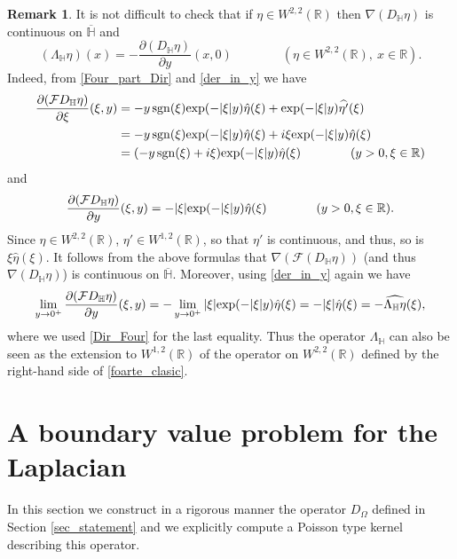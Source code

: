 \documentclass{amsart} %
\numberwithin{equation}{section}
\theoremstyle{definition}
\newtheorem{remark}[theorem]{Remark}
\begin{document}
\begin{remark}\label{rem_clasic}
It is not difficult to check that if $\eta\in W^{2,2}(\mathbb{R})$ then $\nabla(D_\mathbb{H}\eta)$ is continuous on $\overline{\mathbb{H}}$
and
\begin{equation}\label{foarte_clasic}
(\Lambda_\mathbb{H} \eta)(x)=-\frac{\partial (D_\mathbb{H}\eta)}{\partial y}(x,0) \qquad\qquad(\eta\in W^{2,2}(\mathbb{R}),\ x\in \mathbb{R}).
\end{equation}
Indeed, from \eqref{Four_part_Dir} and \eqref{der_in_y} we have
\begin{equation}
\begin{aligned}
 \frac{\partial (\mathcal{F}D_{\mathbb{H}}\eta)}{\partial \xi}(\xi,y)&=-y\,{\rm sgn}(\xi){\rm exp}(-|\xi|y)\hat\eta(\xi)+{\rm exp}(-|\xi|y)\widehat{\eta'}(\xi)\\
 &=-y\,{\rm sgn}(\xi){\rm exp}(-|\xi|y)\hat\eta(\xi)+i\xi{\rm exp}(-|\xi|y)\hat\eta(\xi)\\
 &=(-y\,{\rm sgn}(\xi)+i\xi){\rm exp}(-|\xi|y)\hat\eta(\xi)\qquad\qquad(y>0,\xi\in\mathbb{R})
\end{aligned}
\end{equation}
and
\begin{equation}
\frac{\partial(\mathcal{F}D_{\mathbb{H}}\eta)}{\partial y}(\xi,y)=-|\xi|{\rm exp}(-|\xi|y)\hat\eta(\xi) \qquad\qquad(y>0,\xi\in\mathbb{R}). 
\end{equation}
Since $\eta\in W^{2,2}(\mathbb R)$, $\eta'\in W^{1,2}(\mathbb R)$, so that $\eta'$ is continuous, and thus, so is $\xi\hat\eta(\xi)$. It follows from the above formulas that $\nabla (\mathcal{F}(D_{\mathbb H}\eta))$ (and thus $\nabla(D_{\mathbb H}\eta)$) is continuous on $\overline{\mathbb H}$.
Moreover, using \eqref{der_in_y} again we have
\begin{equation}
\lim_{y\to 0^+}\frac{\partial(\mathcal{F}D_{\mathbb{H}}\eta)}{\partial y}(\xi,y)=-\lim_{y\to 0^+}|\xi|{\rm exp}(-|\xi|y)\hat\eta(\xi)=-|\xi|\hat{\eta}(\xi)=-\widehat{\Lambda_{\mathbb{H}}\eta}(\xi),
\end{equation}
where we used \eqref{Dir_Four} for the last equality.
Thus the operator $\Lambda_\mathbb{H}$ can also be seen as the extension to $W^{1,2}(\mathbb{R})$ of the operator on $W^{2,2}(\mathbb{R})$ defined by the right-hand side of \eqref{foarte_clasic}. 
\end{remark}

\section{A boundary value problem for the Laplacian}
\label{sec_problem_Laplacian}
In this section we construct in a rigorous manner the operator $D_\Omega$ defined in Section \ref{sec_statement} and we explicitly compute a Poisson type kernel describing this operator.
\end{document}
